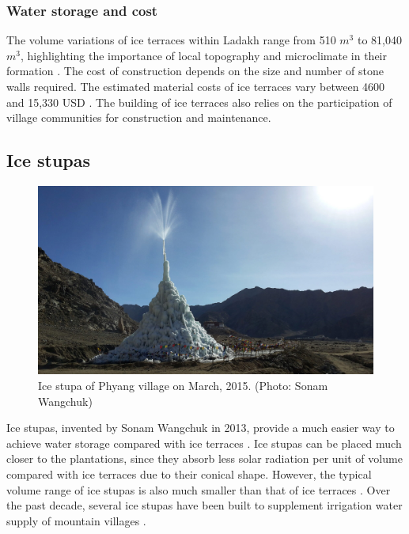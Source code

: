 \subsubsection{Water storage and cost}

The volume variations of ice terraces within Ladakh range from 510 $m^3$ to 81,040 $m^3$, highlighting
the importance of local topography and microclimate in their formation
\citep{nusserSociohydrologyArtificialGlaciers2019, norphelSnowWaterHarvesting2015}. The cost of construction
depends on the size and number of stone walls required. The estimated material costs of ice terraces vary between
4600 and 15,330 USD \citep{nusserSociohydrologyArtificialGlaciers2019}. The building of ice terraces also relies
on the participation of village communities for construction and maintenance.

\subsection{Ice stupas}

\begin{figure}[htb]
	\centering
	\includegraphics[width=\textwidth]{figs/IS_example.jpg}
	\caption{Ice stupa of Phyang village on March, 2015. (Photo: Sonam Wangchuk)}
	\label{fig:ISexample}
\end{figure}

Ice stupas, invented by Sonam Wangchuk in 2013, provide a much easier way to achieve water storage compared with
ice terraces \citep{wangchukIceStupaArtificial2014}. Ice stupas can be placed much closer to the plantations,
since they absorb less solar radiation per unit of volume compared with ice terraces due to their conical shape.
However, the typical volume range of ice stupas is also much smaller than that of ice terraces
\citep{nusserSociohydrologyArtificialGlaciers2019}. Over the past decade, several ice stupas have been built to
supplement irrigation water supply of mountain villages \citep{wangchukIceStupaCompetition2020,
palmerStoringFrozenWater2022, aggarwalAdaptationClimateChange2021}.


